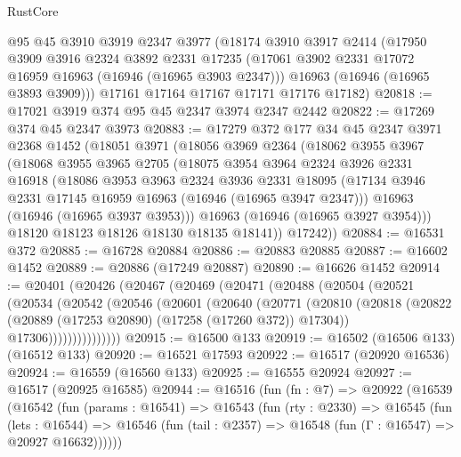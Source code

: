 \begin{lexlean}{RustCore}
\begin{coremodule}
    @95
    @45
    @3910
    @3919
    @2347
    @3977
    (@18174
      @3910
      @3917
      @2414
      (@17950
        @3909
        @3916
        @2324
        @3892
        @2331
        @17235
        (@17061 @3902 @2331 @17072 @16959 @16963 (@16946 (@16965 @3903 @2347)))
        @16963
        (@16946 (@16965 @3893 @3909)))
      @17161
      @17164
      @17167
      @17171
      @17176
      @17182)
@20818 := @17021 @3919 @374 @95 @45 @2347 @3974 @2347 @2442
@20822 := @17269 @374 @45 @2347 @3973
@20883 := @17279
    @372
    @177
    @34
    @45
    @2347
    @3971
    @2368
    @1452
    (@18051
      @3971
      (@18056
        @3969
        @2364
        (@18062
          @3955
          @3967
          (@18068
            @3955
            @3965
            @2705
            (@18075
              @3954
              @3964
              @2324
              @3926
              @2331
              @16918
              (@18086
                @3953
                @3963
                @2324
                @3936
                @2331
                @18095
                (@17134 @3946 @2331 @17145 @16959 @16963 (@16946 (@16965 @3947 @2347)))
                @16963
                (@16946 (@16965 @3937 @3953)))
              @16963
              (@16946 (@16965 @3927 @3954)))
            @18120
            @18123
            @18126
            @18130
            @18135
            @18141))
        @17242))
@20884 := @16531 @372
@20885 := @16728 @20884
@20886 := @20883 @20885
@20887 := @16602 @1452
@20889 := @20886 (@17249 @20887)
@20890 := @16626 @1452
@20914 := @20401
    (@20426
      (@20467
        (@20469
          (@20471
            (@20488
              (@20504
                (@20521
                  (@20534
                    (@20542
                      (@20546
                        (@20601
                          (@20640
                            (@20771
                              (@20810
                                (@20818
                                  (@20822 (@20889 (@17253 @20890) (@17258 (@17260 @372)) @17304))
                                  @17306)))))))))))))))
@20915 := @16500 @133
@20919 := @16502 (@16506 @133) (@16512 @133)
@20920 := @16521 @17593
@20922 := @16517 (@20920 @16536)
@20924 := @16559 (@16560 @133)
@20925 := @16555 @20924
@20927 := @16517 (@20925 @16585)
@20944 := @16516
    (fun (fn : @7) =>
    @20922
      (@16539
        (@16542
          (fun (params : @16541) =>
          @16543
            (fun (rty : @2330) =>
            @16545
              (fun (lets : @16544) =>
              @16546 (fun (tail : @2357) => @16548 (fun (Γ : @16547) => @20927 @16632))))))

\end{coremodule}
\end{lexlean}
